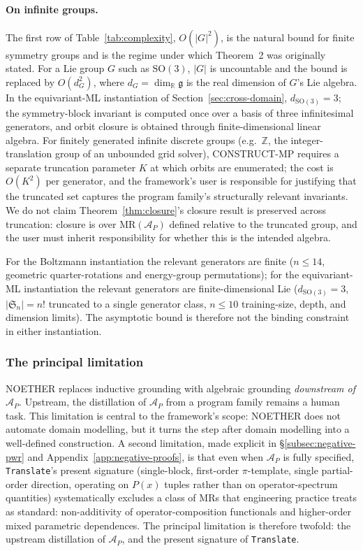 \documentclass[manuscript]{acmart}
\begin{document}
\paragraph{On infinite groups.}
\label{subsec:complexity-prose}
The first row of Table~\ref{tab:complexity}, $O(|G|^2)$, is the natural bound for finite symmetry groups and is the regime under which Theorem~2 was originally stated. For a Lie group $G$ such as $\mathrm{SO}(3)$, $|G|$ is uncountable and the bound is replaced by $O(d_G^2)$, where $d_G = \dim_{\mathbb{R}} \mathfrak{g}$ is the real dimension of $G$'s Lie algebra. In the equivariant-ML instantiation of Section~\ref{sec:cross-domain}, $d_{\mathrm{SO}(3)} = 3$; the symmetry-block invariant is computed once over a basis of three infinitesimal generators, and orbit closure is obtained through finite-dimensional linear algebra. For finitely generated infinite discrete groups (e.g.\ $\mathbb{Z}$, the integer-translation group of an unbounded grid solver), CONSTRUCT-MP requires a separate truncation parameter $K$ at which orbits are enumerated; the cost is $O(K^2)$ per generator, and the framework's user is responsible for justifying that the truncated set captures the program family's structurally relevant invariants. We do not claim Theorem~\ref{thm:closure}'s closure result is preserved across truncation: closure is over $\mathrm{MR}(\mathcal{A}_P)$ defined relative to the truncated group, and the user must inherit responsibility for whether this is the intended algebra.

For the Boltzmann instantiation the relevant generators are finite ($n \le 14$, geometric quarter-rotations and energy-group permutations); for the equivariant-ML instantiation the relevant generators are finite-dimensional Lie ($d_{\mathrm{SO}(3)} = 3$, $|\mathfrak{S}_n| = n!$ truncated to a single generator class, $n \le 10$ training-size, depth, and dimension limits). The asymptotic bound is therefore not the binding constraint in either instantiation.

\subsubsection{The principal limitation}

NOETHER replaces inductive grounding with algebraic grounding \emph{downstream of $\mathcal{A}_P$}. Upstream, the distillation of $\mathcal{A}_P$ from a program family remains a human task. This limitation is central to the framework's scope: NOETHER does not automate domain modelling, but it turns the step after domain modelling into a well-defined construction. A second limitation, made explicit in \S\ref{subsec:negative-pwr} and Appendix~\ref{app:negative-proofs}, is that even when $\mathcal{A}_P$ is fully specified, \texttt{Translate}'s present signature (single-block, first-order $\pi$-template, single partial-order direction, operating on $P(x)$ tuples rather than on operator-spectrum quantities) systematically excludes a class of MRs that engineering practice treats as standard: non-additivity of operator-composition functionals and higher-order mixed parametric dependences. The principal limitation is therefore twofold: the upstream distillation of $\mathcal{A}_P$, and the present signature of \texttt{Translate}.
\end{document}
